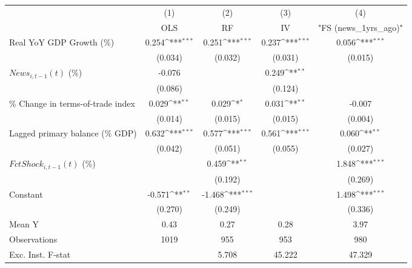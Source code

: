 {
\def\sym#1{\ifmmode^{#1}\else\(^{#1}\)\fi}
\begin{tabular}{l*{4}{c}}
\toprule
                    &\multicolumn{1}{c}{(1)}&\multicolumn{1}{c}{(2)}&\multicolumn{1}{c}{(3)}&\multicolumn{1}{c}{(4)}\\
                    &\multicolumn{1}{c}{OLS}&\multicolumn{1}{c}{RF}&\multicolumn{1}{c}{IV}&\multicolumn{1}{c}{ "FS (news_1yrs_ago)" }\\
\midrule
Real YoY GDP Growth (\%)&       0.254\sym{***}&       0.251\sym{***}&       0.237\sym{***}&       0.056\sym{***}\\
                    &     (0.034)         &     (0.032)         &     (0.031)         &     (0.015)         \\
\addlinespace
$ News_{i,t-1}(t)$ (\%)&      -0.076         &                     &       0.249\sym{**} &                     \\
                    &     (0.086)         &                     &     (0.124)         &                     \\
\addlinespace
\% Change in terms-of-trade index&       0.029\sym{**} &       0.029\sym{*}  &       0.031\sym{**} &      -0.007         \\
                    &     (0.014)         &     (0.015)         &     (0.015)         &     (0.004)         \\
\addlinespace
Lagged primary balance (\% GDP)&       0.632\sym{***}&       0.577\sym{***}&       0.561\sym{***}&       0.060\sym{**} \\
                    &     (0.042)         &     (0.051)         &     (0.055)         &     (0.027)         \\
\addlinespace
$ FctShock_{i,t-1}(t)$ (\%)&                     &       0.459\sym{**} &                     &       1.848\sym{***}\\
                    &                     &     (0.192)         &                     &     (0.269)         \\
\addlinespace
Constant            &      -0.571\sym{**} &      -1.468\sym{***}&                     &       1.498\sym{***}\\
                    &     (0.270)         &     (0.249)         &                     &     (0.336)         \\
\midrule
Mean Y              &        0.43         &        0.27         &        0.28         &        3.97         \\
Observations        &        1019         &         955         &         953         &         980         \\
Exc. Inst. F-stat   &                     &       5.708         &      45.222         &      47.329         \\
\bottomrule
\end{tabular}
}
